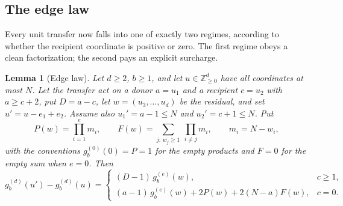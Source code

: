 \documentclass[pdflatex,sn-mathphys-num]{sn-jnl}
\theoremstyle{thmstyleone}
\newtheorem{lemma}[theorem]{Lemma}
\theoremstyle{thmstylethree}
\theoremstyle{thmstyletwo}
\newcommand{\Z}{\mathbb Z}
\begin{document}
\subsection{The edge law}

Every unit transfer now falls into one of exactly two regimes, according to
whether the recipient coordinate is positive or zero.  The first regime obeys
a clean factorization; the second pays an explicit surcharge.

\begin{lemma}[Edge law]
\label{lem:edge-law}
Let $d\ge2$, $b\ge1$, and let $u\in\Z_{\ge0}^d$ have all coordinates at most
$N$.  Let the transfer act on a donor $a=u_1$ and a recipient $c=u_2$ with
$a\ge c+2$, put $D=a-c$, let $w=(u_3,\ldots,u_d)$ be the residual, and set
$u'=u-e_1+e_2$.  Assume also $u_1'=a-1\le N$ and $u_2'=c+1\le N$.  Put
\begin{equation}
 P(w)=\prod_{i=1}^em_i,\qquad
 F(w)=\sum_{j:\,w_j\ge1}\ \prod_{i\ne j}m_i,\qquad m_i=N-w_i,
 \label{eq:residual-functionals}
\end{equation}
with the conventions $g_b^{(0)}(0)=P=1$ for the empty products and $F=0$ for
the empty sum when $e=0$.  Then
\begin{equation}
 g_b^{(d)}(u')-g_b^{(d)}(u)
 =\begin{cases}
  (D-1)\,g_b^{(e)}(w),&c\ge1,\\[4pt]
  (a-1)\,g_b^{(e)}(w)+2P(w)+2(N-a)F(w),&c=0.
 \end{cases}
 \label{eq:edge-law}
\end{equation}
\end{lemma}
\end{document}

